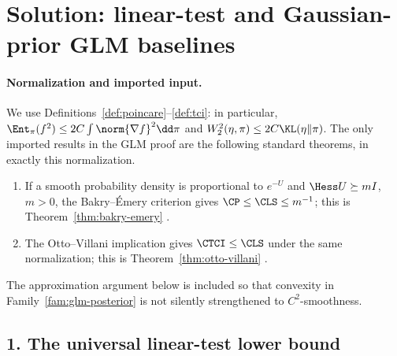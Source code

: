 \documentclass[../main.tex]{subfiles}
\begin{document}

\section*{Solution: linear-test and Gaussian-prior GLM baselines}
\label{sec:sol-glm-linear-baselines}

\paragraph{Normalization and imported input.}
We use Definitions~\ref{def:poincare}--\ref{def:tci}: in particular,
\(\Ent_\pi(f^2)\le 2C\int\norm{\nabla f}^2\dd\pi\) and
\(W_2^2(\eta,\pi)\le2C\KL(\eta\|\pi)\).  The only imported results in the
GLM proof are the following standard theorems, in exactly this normalization.

\begin{enumerate}[leftmargin=1.7em]
  \item If a smooth probability density is proportional to \(e^{-U}\) and
  \(\Hess U\succeq mI\), \(m>0\), the Bakry--\'Emery criterion gives
  \(\CP\le\CLS\le m^{-1}\); this is Theorem~\ref{thm:bakry-emery}
  \cite{BakryEmery1985,BakryGentilLedoux2014}.
  \item The Otto--Villani implication gives \(\CTCI\le\CLS\) under the same
  normalization; this is Theorem~\ref{thm:otto-villani}
  \cite{OttoVillani2000,Villani2008}.
\end{enumerate}

The approximation argument below is included so that convexity in
Family~\ref{fam:glm-posterior} is not silently strengthened to \(C^2\)-smoothness.

\subsection*{1. The universal linear-test lower bound}
\end{document}
